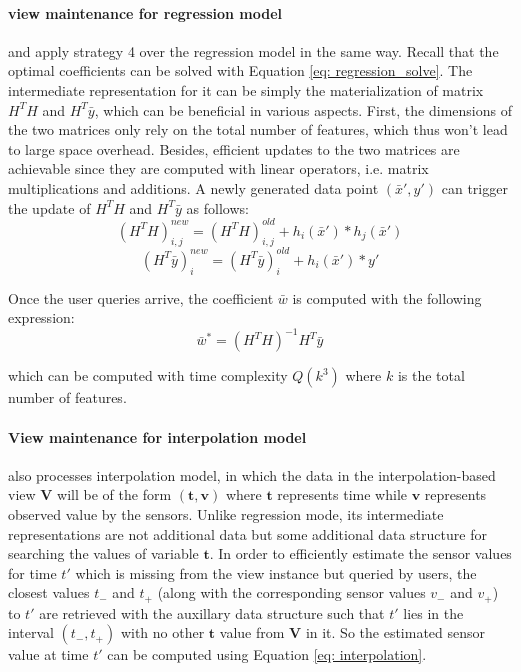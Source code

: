 \paragraph{view maintenance for regression model} \cite{deshpande2006mauvedb} and \cite{gupta2015processing} apply strategy 4 over the regression model in the same way. Recall that the optimal coefficients can be solved with Equation \ref{eq: regression_solve}. The intermediate representation for it can be simply the materialization of matrix $H^TH$ and $H^T\bar{y}$, which can be beneficial in various aspects. First, the dimensions of the two matrices only rely on the total number of features, which thus won't lead to large space overhead. Besides, efficient updates to the two matrices are achievable since they are computed with linear operators, i.e. matrix multiplications and additions. A newly generated data point $(\bar{x}',y')$ can trigger the update of $H^TH$ and $H^T\bar{y}$ as follows:
\begin{equation}
    (H^TH)^{new}_{i,j} = (H^TH)^{old}_{i,j} + h_i(\bar{x}')*h_j(\bar{x}')
\end{equation}
\begin{equation}
    (H^T\bar{y})^{new}_i = (H^T\bar{y})^{old}_i + h_i(\bar{x}')*y'
\end{equation}

Once the user queries arrive, the coefficient $\bar{w}$ is computed with the following expression:
\begin{equation}
    \bar{w}^*=(H^TH)^{-1}H^T\bar{y}
\end{equation}

which can be computed with time complexity $Q(k^3)$ where $k$ is the total number of features.

\paragraph{View maintenance for interpolation model} \cite{deshpande2006mauvedb} also processes interpolation model, in which the data in the interpolation-based view $\textbf{V}$ will be of the form $(\textbf{t}, \textbf{v})$ where $\textbf{t}$ represents time while $\textbf{v}$ represents observed value by the sensors. Unlike regression mode, its intermediate representations are not additional data but some additional data structure for searching the values of variable $\textbf{t}$. In order to efficiently estimate the sensor values for time $t'$ which is missing from the view instance but queried by users, the closest values $t_{-}$ and $t_{+}$ (along with the corresponding sensor values $v_{-}$ and $v_{+}$) to $t'$ are retrieved with the auxillary data structure such that $t'$ lies in the interval $(t_{-}, t_{+})$ with no other $\textbf{t}$ value from $\textbf{V}$ in it. So the estimated sensor value at time $t'$ can be computed using Equation \ref{eq: interpolation}.


